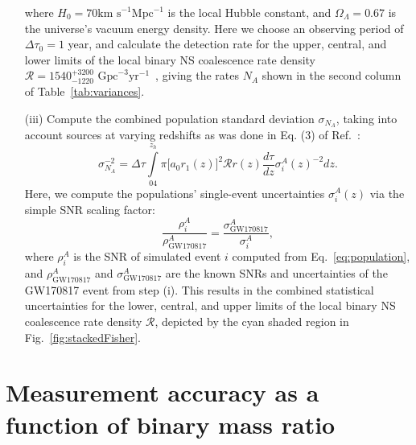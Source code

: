 \documentclass[prd,twocolumn,nofootinbib,superscriptaddress,amsmath,amssymb]{revtex4-1}
\begin{document}
\begin{enumerate}
where $H_0 = 70 \text{km s}^{-1}\text{Mpc}^{-1}$ is the local Hubble constant, and $\Omega_{\Lambda}=0.67$ is the universe's vacuum energy density.
Here we choose an observing period of $\Delta \tau_0 = 1$ year, and calculate the detection rate for the upper, central, and lower limits of the local binary NS coalescence rate density $\mathcal{R}=1540^{+3200}_{-1220} \text{ Gpc}^{-3}\text{yr}^{-1}$~\cite{Abbott2017}, giving the rates $N_A$ shown in the second column of Table~\ref{tab:variances}.

\item[(iii)] Compute the combined population standard deviation $\sigma_{N_A}$, taking into account sources at varying redshifts as was done in Eq. (3) of Ref.~\cite{Takahiro}:
\begin{equation}
\sigma_{N_A}^{-2}=\Delta \tau \int\limits^{z_h}_04 \pi \lbrack a_0 r_1(z)\rbrack^2 \mathcal{R}r(z)\frac{d\tau}{dz}\sigma^A_i(z)^{-2}dz.
\end{equation}
Here, we compute the populations' single-event uncertainties $\sigma_i^A(z)$ via the simple SNR scaling factor: 
\begin{equation}
\frac{\rho_i^A}{\rho_{\text{GW170817}}^A} = \frac{\sigma_{\text{GW170817}}^A}{\sigma_i^A},
\end{equation}
where $\rho_i^A$ is the SNR of simulated event $i$ computed from Eq.~\ref{eq:population}, and $\rho_{\text{GW170817}}^A$ and $\sigma_{\text{GW170817}}^A$ are the known SNRs and uncertainties of the GW170817 event from step (i).
This results in the combined statistical uncertainties for the lower, central, and upper limits of the local binary NS coalescence rate density $\mathcal{R}$, depicted by the cyan shaded region in Fig.~\ref{fig:stackedFisher}.
\end{enumerate}


\section{Measurement accuracy as a function of binary mass ratio}\label{app:measurement}
\end{document}
